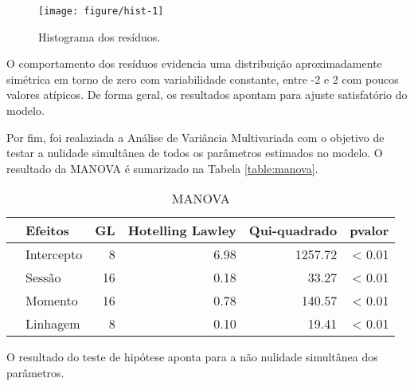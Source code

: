 \begin{knitrout}
\color{fgcolor}\begin{figure}[H]
\texttt{[image: figure/hist-1]} \caption[Histograma dos resíduos]{Histograma dos resíduos.}\label{fig:hist}
\end{figure}


\end{knitrout}

O comportamento dos resíduos evidencia uma distribuição aproximadamente simétrica em torno de zero com variabilidade constante, entre -2 e 2 com poucos valores atípicos. De forma geral, os resultados apontam para ajuste satisfatório do modelo.

Por fim, foi realaziada a Análise de Variância Multivariada com o objetivo de testar a nulidade simultânea de todos os parâmetros estimados no modelo. O resultado da MANOVA é sumarizado na Tabela \autoref{table:manova}.

\begin{table}[H]
\caption{MANOVA}
\centering
\begin{tabular}{rlrrrr}
  \hline
 & Efeitos & GL & Hotelling Lawley & Qui-quadrado & p\-valor \\ 
  \hline
& Intercepto & 8  & 6.98 & 1257.72 & < 0.01 \\ 
& Sessão     & 16 & 0.18 & 33.27   & < 0.01 \\ 
& Momento    & 16 & 0.78 & 140.57  & < 0.01 \\ 
& Linhagem   & 8  & 0.10 & 19.41   & < 0.01 \\ 
   \hline
\end{tabular}
\label{table:manova}
\end{table}

O resultado do teste de hipótese aponta para a não nulidade simultânea dos parâmetros.
